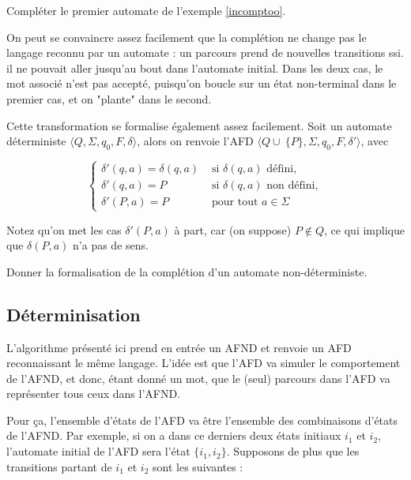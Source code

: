 \begin{exercice}
Compléter le premier automate de l'exemple \ref{incomptoo}.
\end{exercice}

On peut se convaincre assez facilement que la complétion ne change pas le langage reconnu par un automate : un parcours prend de nouvelles transitions ssi. il ne pouvait aller jusqu'au bout dans l'automate initial. Dans les deux cas, le mot associé n'est pas accepté, puisqu'on boucle sur un état non-terminal dans le premier cas, et on "plante" dans le second.

Cette transformation se formalise également assez facilement. Soit un automate déterministe $\big \langle Q,\Sigma,q_0,F,\delta \big \rangle$, alors on renvoie l'AFD $\big \langle Q \cup~\{P\},\Sigma,q_0,F,\delta' \big \rangle$, avec

\[
\begin{cases}
\delta'(q,a) = \delta(q,a) &\text{ si } \delta(q,a) \text{ défini},\\[1ex]
\delta'(q,a) = P &\text{ si } \delta(q,a) \text{ non défini},\\[1ex]
\delta'(P,a) = P &\text{ pour tout } a \in \Sigma  \end{cases}
\]

Notez qu'on met les cas $\delta'(P,a)$ à part, car (on suppose) $P \not\in Q$, ce qui implique que $\delta(P,a)$ n'a pas de sens.

\begin{exercice}
Donner la formalisation de la complétion d'un automate non-déterministe.
\end{exercice}

\subsection{Déterminisation}
\label{det}

L'algorithme présenté ici prend en entrée un AFND et renvoie un AFD reconnaissant le même langage. L'idée est que l'AFD va simuler le comportement de l'AFND, et donc, étant donné un mot, que le (seul) parcours dans l'AFD va représenter tous ceux dans l'AFND.

Pour ça, l'ensemble d'états de l'AFD va être l'ensemble des combinaisons d'états de l'AFND. Par exemple, si on a dans ce derniers deux états initiaux $i_1$ et $i_2$, l'automate initial de l'AFD sera l'état $\{i_1, i_2\}$. Supposons de plus que les transitions partant de $i_1$ et $i_2$ sont les suivantes :

